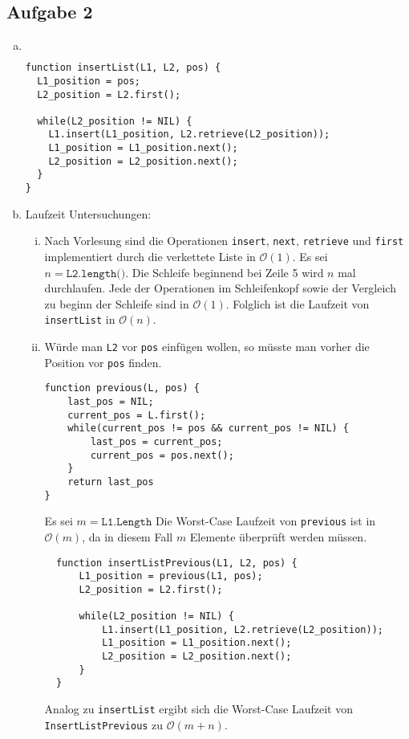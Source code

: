 \documentclass[11pt]{article}
\begin{document}
\subsection*{Aufgabe 2}
\begin{enumerate}[a)]
  \item  $ $
\begin{center}
\begin{lstlisting}
function insertList(L1, L2, pos) {
  L1_position = pos;
  L2_position = L2.first();

  while(L2_position != NIL) {
    L1.insert(L1_position, L2.retrieve(L2_position));
    L1_position = L1_position.next();
    L2_position = L2_position.next();
  }
}
\end{lstlisting}
\end{center}
    
  \item Laufzeit Untersuchungen:
    \begin{enumerate}[i)]
      \item
        Nach Vorlesung sind die Operationen \texttt{insert}, \texttt{next}, 
        \texttt{retrieve} und \texttt{first} implementiert durch die verkettete
        Liste in $\mathcal{O}(1)$. Es sei $n=\texttt{L2.length()}$. 
        Die Schleife beginnend bei Zeile 5 wird $n$ mal durchlaufen. Jede der 
        Operationen im Schleifenkopf sowie der Vergleich zu beginn der Schleife
        sind in $\mathcal{O}(1)$. Folglich ist die Laufzeit von \texttt{insertList}
        in $\mathcal{O}(n)$.
      \item W\"urde man \texttt{L2} vor \texttt{pos} einf\"ugen wollen, so
        m\"usste man vorher die Position vor \texttt{pos} finden.
\begin{lstlisting}
function previous(L, pos) {
    last_pos = NIL;
    current_pos = L.first();
    while(current_pos != pos && current_pos != NIL) {
        last_pos = current_pos;
        current_pos = pos.next();
    }
    return last_pos
}
\end{lstlisting}
        Es sei $m=\texttt{L1.Length}$ 
        Die Worst-Case Laufzeit von \texttt{previous} ist in $\mathcal{O}(m)$,
        da in diesem Fall $m$ Elemente \"uberpr\"uft werden m\"ussen. 

\begin{lstlisting}
  function insertListPrevious(L1, L2, pos) {
      L1_position = previous(L1, pos);
      L2_position = L2.first();
  
      while(L2_position != NIL) {
          L1.insert(L1_position, L2.retrieve(L2_position));
          L1_position = L1_position.next();
          L2_position = L2_position.next();
      }
  }
\end{lstlisting}
        
        Analog zu \texttt{insertList} ergibt sich die Worst-Case Laufzeit von
        \texttt{InsertListPrevious} zu $\mathcal{O}(m + n)$.

  \end{enumerate}
\end{enumerate}
\newpage
\end{document}
